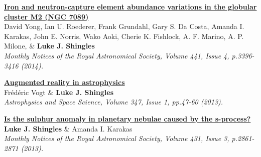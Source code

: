\documentclass[11pt]{res} %
\newcommand{\highlight}[1]{\textbf{#1}}
\newcommand{\articletitle}[1]{{\textbf{\color{black} #1}}\\}
\newcommand{\articleauthors}[1]{#1\\}
\newcommand{\articlejournalref}[1]{\textit{#1}}
\begin{document}
\begin{resume}
\articletitle{\href{http://adsabs.harvard.edu/abs/2014MNRAS.441.3396Y}{Iron and neutron-capture element abundance variations in the globular cluster M2 (NGC 7089)}}
\articleauthors{David Yong, Ian U. Roederer, Frank Grundahl, Gary S. Da Costa, Amanda I. Karakas, John E. Norris, Wako Aoki, Cherie K. Fishlock, A. F. Marino, A. P. Milone, \& \highlight{Luke J. Shingles}}
\articlejournalref{Monthly Notices of the Royal Astronomical Society, Volume 441, Issue 4, p.3396-3416 (2014).}

\articletitle{\href{http://adsabs.harvard.edu/abs/2013Ap\%26SS.347...47V}{Augmented reality in astrophysics}}
\articleauthors{Fr\'{e}d\'{e}ric Vogt \& \highlight{Luke J. Shingles}}
\articlejournalref{Astrophysics and Space Science, Volume 347, Issue 1, pp.47-60 (2013).}

\articletitle{\href{http://adsabs.harvard.edu/abs/2013MNRAS.431.2861S}{Is the sulphur anomaly in planetary nebulae caused by the s-process?}}
\articleauthors{\highlight{Luke J. Shingles} \& Amanda I. Karakas}
\articlejournalref{Monthly Notices of the Royal Astronomical Society, Volume 431, Issue 3, p.2861-2871 (2013).}

\end{resume}
\end{document}
